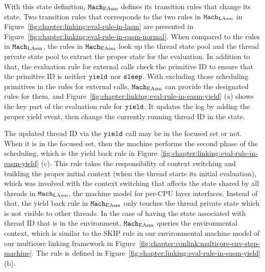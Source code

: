 With this state definition, ${\mathrm{\texttt{Mach}}}_{\mathrm{EAsm}}$ defines its transition rules that change its state. 
Two transition rules that corresponds to the two rules in ${\mathrm{\texttt{Mach}}}_{\mathrm{LAsm}}$ in Figure~\ref{fig:chapter:linking:eval-rule-in-lasm}
are presented in Figure~\ref{fig:chapter:linking:eval-rule-in-easm-normal}.
When compared to the rules in ${\mathrm{\texttt{Mach}}}_{\mathrm{LAsm}}$,
the rules in ${\mathrm{\texttt{Mach}}}_{\mathrm{EAsm}}$ look up the thread state pool and the thread private state pool 
to extract the proper state for the evaluation.
In addition to that, the evaluation rule for external calls check the primitive ID to ensure that 
the primitive ID is neither ${\mathrm{\texttt{yield}}}$ nor ${\mathrm{\texttt{sleep}}}$. 
With excluding those scheduling primitives in the rules for external calls, 
${\mathrm{\texttt{Mach}}}_{\mathrm{EAsm}}$ can provide the designated rules for them, and 
Figure~\ref{fig:chapter:linking:eval-rule-in-easm-yield} (a) shows
the key part of the evaluation rule for ${\mathrm{\texttt{yield}}}$. 
It updates the log by adding the proper yield event, then change the currently running thread ID in the state. 

The updated thread ID via the ${\mathrm{\texttt{yield}}}$ call may be in the focused set or not. 
When it is in the focused set, 
then the machine performs the second phase of the scheduling, 
which is the yield back rule in Figure~\ref{fig:chapter:linking:eval-rule-in-easm-yield} (c).
This rule takes the responsibility of context switching and building the proper initial context (when the thread starts its initial evaluation),
which was involved with the context switching that affects the state shared by all threads in ${\mathrm{\texttt{Mach}}}_{\mathrm{LAsm}}$, the machine model for per-CPU layer interfaces. 
Instead of that,
the yield back rule in ${\mathrm{\texttt{Mach}}}_{\mathrm{EAsm}}$ only touches the thread private state which is not visible to other threads.
In the case of having the state associated with thread ID that is in the environment,
${\mathrm{\texttt{Mach}}}_{\mathrm{EAsm}}$ queries the environmental context, which is similar to the \textsf{SKIP} rule in our environmental machine model of our multicore linking framework in Figure~\ref{fig:chapter:conlink:multicore-env-step-machine}. 
The rule is defined in Figure~\ref{fig:chapter:linking:eval-rule-in-easm-yield} (b).

